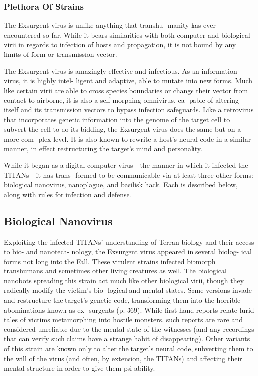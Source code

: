 \subsubsection{Plethora Of Strains }

The Exsurgent virus is unlike anything that transhu-
manity has ever encountered so far. While it bears 
similarities with both computer and biological virii in 
regards to infection of hosts and propagation, it is not 
bound by any limits of form or transmission vector. 

The Exsurgent virus is amazingly effective and 
infectious. As an information virus, it is highly intel-
ligent and adaptive, able to mutate into new forms. 
Much like certain virii are able to cross species 
boundaries or change their vector from contact to 
airborne, it is also a self-morphing omnivirus, ca-
pable of altering itself and its transmission vectors 
to bypass infection safeguards. Like a retrovirus that 
incorporates genetic information into the genome of 
the target cell to subvert the cell to do its bidding, the 
Exsurgent virus does the same but on a more com-
plex level. It is also known to rewrite a host's neural 
code in a similar manner, in effect restructuring the 
target's mind and personality.

While it began as a digital computer virus—the 
manner in which it infected the TITANs—it has trans-
formed to be communicable via at least three other 
forms: biological nanovirus, nanoplague, and basilisk 
hack. Each is described below, along with rules for 
infection and defense.

\subsection{Biological Nanovirus}

Exploiting the infected TITANs' understanding of 
Terran biology and their access to bio- and nanotech-
nology, the Exsurgent virus appeared in several biolog-
ical forms not long into the Fall. These virulent strains 
infected biomorph transhumans and sometimes other 
living creatures as well. The biological nanobots 
spreading this strain act much like other biological 
virii, though they radically modify the victim's bio-
logical and mental states. Some versions invade and 
restructure the target's genetic code, transforming 
them into the horrible abominations known as ex-
surgents (p. 369). While first-hand reports relate lurid 
tales of victims metamorphing into hostile monsters, 
such reports are rare and considered unreliable due to 
the mental state of the witnesses (and any recordings 
that can verify such claims have a strange habit of 
disappearing). Other variants of this strain are known 
only to alter the target's neural code, subverting them 
to the will of the virus (and often, by extension, the 
TITANs) and affecting their mental structure in order 
to give them psi ability.

